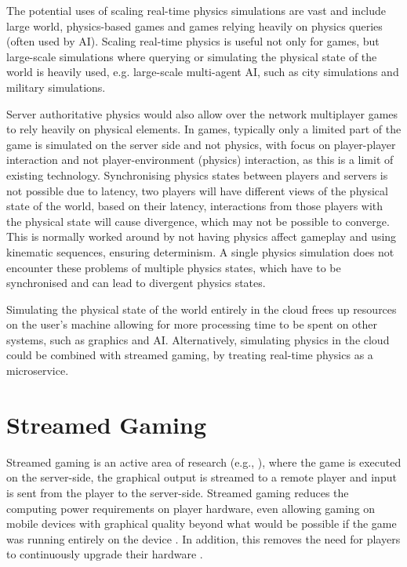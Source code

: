 The potential uses of scaling real-time physics simulations are vast and include large world, physics-based games and games relying heavily on physics queries (often used by AI). Scaling real-time physics is useful not only for games, but large-scale simulations where querying or simulating the physical state of the world is heavily used, e.g. large-scale multi-agent AI, such as city simulations and military simulations. 

Server authoritative physics would also allow over the network multiplayer games to rely heavily on physical elements. In games, typically only a limited part of the game is simulated on the server side and not physics, with focus on player-player interaction and not player-environment (physics) interaction, as this is a limit of existing technology. 
Synchronising physics states between players and servers is not possible due to latency, two players will have different views of the physical state of the world, based on their latency, interactions from those players with the physical state will cause divergence, which may not be possible to converge. This is normally worked around by not having physics affect gameplay and using kinematic sequences, ensuring determinism. A single physics simulation does not encounter these problems of multiple physics states, which have to be synchronised and can lead to divergent physics states. 

Simulating the physical state of the world entirely in the cloud frees up resources on the user's machine allowing for more processing time to be spent on other systems, such as graphics and AI. Alternatively, simulating physics in the cloud could be combined with streamed gaming, by treating real-time physics as a microservice.

\section{Streamed Gaming}
Streamed gaming is an active area of research (e.g., \cite{GARCIAVALLS}), where the game is executed on the server-side, the graphical output is streamed to a remote player and input is sent from the player to the server-side.
Streamed gaming reduces the computing power requirements on player hardware, even allowing gaming on mobile devices with graphical quality beyond what would be possible if the game was running entirely on the device \cite{CloudGamingArchPerf}. In addition, this removes the need for players to continuously upgrade their hardware \cite{LatencyoOfCloudGamingSystems}. 

